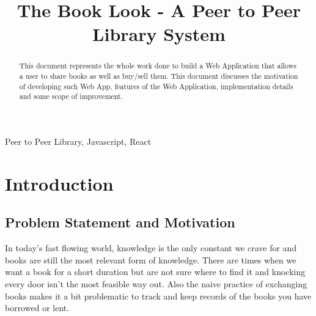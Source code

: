 \documentclass[conference]{IEEEtran}
\makeatletter
\newcommand{\linebreakand}{
  \end{@IEEEauthorhalign}
  \hfill\mbox{}\par
  \mbox{}\hfill\begin{@IEEEauthorhalign}
}
\makeatother
\begin{document}
\title{The Book Look - A Peer to Peer Library System\\
}

\author{
\and
{}
}

\maketitle
\begin{abstract}
This document represents the whole work done to build a Web Application that allows a user to share books as well as buy/sell them. This document discusses the motivation of developing such Web App, features of the Web Application, implementation details and some scope of improvement.
\end{abstract}
\begin{IEEEkeywords}
Peer to Peer Library, Javascript, React
\end{IEEEkeywords}


\section{Introduction}
\subsection{Problem Statement and Motivation}
In today's fast flowing world, knowledge is the only constant we crave for and books are still the most relevant form of knowledge.
There are times when we want a book for a short duration but are not sure where to find it and knocking every door isn't the most feasible way out. Also the naive practice of exchanging books makes it a bit problematic to track and keep records of the books you have borrowed or lent.
\end{document}
